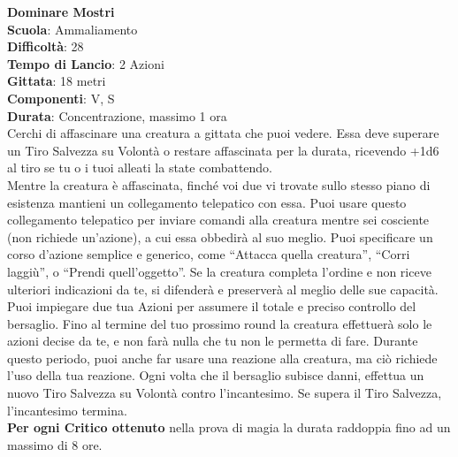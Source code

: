 \begin{multicols}{2}
\medskip\textbf{Dominare Mostri}\\
\textbf{Scuola}: Ammaliamento\\
\textbf{Difficoltà}:  28\\
\textbf{Tempo di Lancio}: 2 Azioni\\
\textbf{Gittata}: 18 metri\\
\textbf{Componenti}: V, S\\
\textbf{Durata}: Concentrazione, massimo 1 ora\\
Cerchi di affascinare una creatura a gittata che puoi vedere. Essa deve superare un Tiro Salvezza su Volontà o restare affascinata per la durata, ricevendo +1d6 al tiro se tu o i tuoi alleati la state combattendo.\\
Mentre la creatura è affascinata, finché voi due vi trovate sullo stesso piano di esistenza mantieni un collegamento telepatico con essa. Puoi usare questo collegamento telepatico per inviare comandi alla creatura mentre sei cosciente (non richiede un'azione), a cui essa obbedirà al suo meglio. Puoi specificare un corso d’azione semplice e generico, come “Attacca quella creatura”, “Corri laggiù”, o “Prendi quell'oggetto”. Se la creatura completa l’ordine e non riceve ulteriori indicazioni da te, si difenderà e preserverà al meglio delle sue capacità.\\
Puoi impiegare due tua Azioni per assumere il totale e preciso controllo del bersaglio. Fino al termine del tuo prossimo round la creatura effettuerà solo le azioni decise da te, e non farà nulla che tu non le permetta di fare. Durante questo periodo, puoi anche far usare una reazione alla creatura, ma ciò richiede l’uso della tua reazione. Ogni volta che il bersaglio subisce danni, effettua un nuovo Tiro Salvezza su Volontà contro l'incantesimo. Se supera il Tiro Salvezza, l'incantesimo termina.\\
\textbf{Per ogni Critico ottenuto} nella prova di magia la durata raddoppia fino ad un massimo di 8 ore.


\end{multicols}
